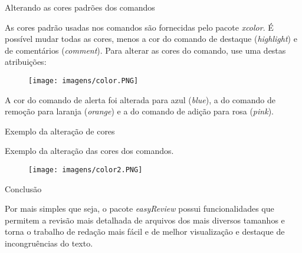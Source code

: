 \documentclass[aspectratio=169,smaller]{beamer}
\begin{document}
\begin{frame}{Alterando as cores padrões dos comandos}
\justifying

As cores padrão usadas nos comandos são fornecidas pelo pacote \textit{xcolor}. É possível mudar todas as cores, menos a cor do comando de destaque (\textit{highlight}) e de comentários (\textit{comment}). Para alterar as cores do comando, use uma destas atribuições:

\begin{figure}
        \centering
        \texttt{[image: imagens/color.PNG]}
    \end{figure}

\noindent A cor do comando de alerta foi alterada para azul (\textit{blue}), a do comando de remoção para laranja (\textit{orange}) e a do comando de adição para rosa (\textit{pink}).
\end{frame}

\begin{frame}{Exemplo da alteração de cores}
\justifying

Exemplo da alteração das cores dos comandos.

\begin{figure}
        \centering
        \texttt{[image: imagens/color2.PNG]}
    \end{figure}

\end{frame}

\begin{frame}{Conclusão}
\justifying

Por mais simples que seja, o pacote \textit{easyReview} possui funcionalidades que permitem a revisão mais detalhada de arquivos dos mais diversos tamanhos e torna o trabalho de redação mais fácil e de melhor visualização e destaque de incongruências do texto.

\end{frame}
\end{document}
